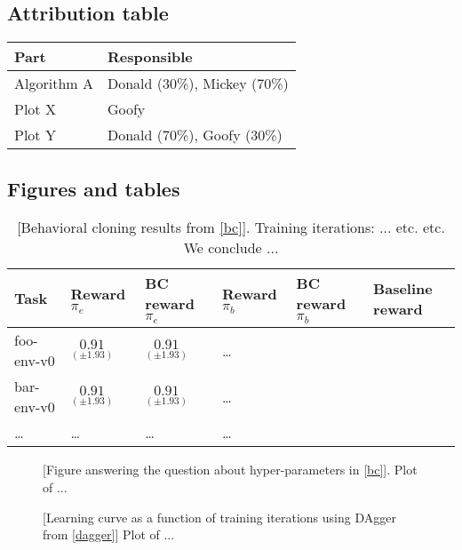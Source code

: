 \documentclass[12pt,twoside]{article}
\begin{document}
\newpage
$ $
\subsection*{Attribution table}
{ \centering	
	\begin{tabular}{l|l} \toprule
		Part	& Responsible  \\ \midrule 
		Algorithm A	& Donald (30\%), Mickey (70\%)  \\ 
		Plot X	& Goofy   \\
		Plot Y & Donald (70\%), Goofy (30\%) \\ 
		\bottomrule
	\end{tabular} \par
}

\subsection*{Figures and tables}

\begin{table}[h!]
	{ \centering	
		\begin{tabular}{l|lllll} \toprule			
			Task	& Reward $\pi_e$ & BC reward $\pi_e$ & Reward $\pi_b$ & BC reward $\pi_b$  & Baseline reward \\ \midrule 
			foo-env-v0	&  $\underset{(\pm 1.93)}{0.91}$ &  $\underset{(\pm 1.93)}{0.91}$ & \dots &  &  \\ 
			bar-env-v0 	&  $\underset{(\pm 1.93)}{0.91}$ &  $\underset{(\pm 1.93)}{0.91}$ & \dots & &  \\
			\ldots & \ldots & \ldots & \dots & &  \\ 
			\bottomrule
		\end{tabular} \par
	}
	\caption{ {\color{gray} [Behavioral cloning results from \cref{bc}].} Training iterations: ... etc. etc. We conclude ... }
\end{table}

\begin{figure}[h]
	\caption{ {\color{gray}[Figure answering the question about hyper-parameters in \cref{bc}]. } Plot of ... }
\end{figure}

\begin{figure}[h]
	\caption{  {\color{gray}[Learning curve as a function of training iterations using DAgger from \cref{dagger}] } Plot of ...  }
\end{figure}
\end{document}
